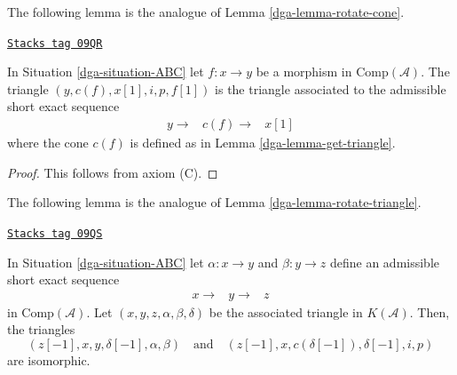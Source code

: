 The following lemma is the analogue of Lemma \ref{dga-lemma-rotate-cone}.

\begin{lemma}
\label{dga-lemma-restate-axiom-c}
\href{https://stacks.math.columbia.edu/tag/09QR}{\texttt{Stacks tag 09QR}}

In Situation \ref{dga-situation-ABC}
let $f: x \to y$ be a morphism in $\text{Comp}(\mathcal{A})$.
The triangle $(y, c(f), x[1], i, p, f[1])$ is the triangle associated
to the admissible short exact sequence
$$
\begin{array}{ccc}y\longrightarrow & c(f) \longrightarrow & x[1]\end{array}
$$
where the cone $c(f)$ is defined as in Lemma \ref{dga-lemma-get-triangle}.
\end{lemma}

\begin{proof}
This follows from axiom (C).
\end{proof}

The following lemma is the analogue of Lemma \ref{dga-lemma-rotate-triangle}.

\begin{lemma}
\label{dga-lemma-cone-rotate-isom}
\href{https://stacks.math.columbia.edu/tag/09QS}{\texttt{Stacks tag 09QS}}

In Situation \ref{dga-situation-ABC} let $\alpha : x \to y$ and $\beta : y \to z$
define an admissible short exact sequence
$$
\begin{array}{ccc}x \longrightarrow & y\longrightarrow & z\end{array}
$$
in $\text{Comp}(\mathcal{A})$. Let $(x, y, z, \alpha, \beta, \delta)$
be the associated triangle in $K(\mathcal{A})$. Then, the triangles
$$
(z[-1], x, y, \delta[-1], \alpha, \beta)
\quad\text{and}\quad
(z[-1], x, c(\delta[-1]), \delta[-1], i, p)
$$
are isomorphic.
\end{lemma}

